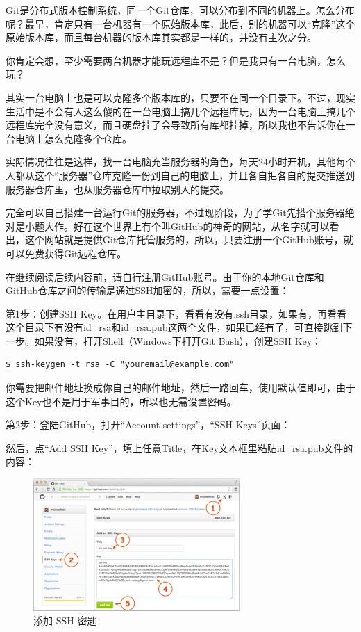 Git是分布式版本控制系统，同一个Git仓库，可以分布到不同的机器上。怎么分布呢？最早，肯定只有一台机器有一个原始版本库，此后，别的机器可以“克隆”这个原始版本库，而且每台机器的版本库其实都是一样的，并没有主次之分。

你肯定会想，至少需要两台机器才能玩远程库不是？但是我只有一台电脑，怎么玩？

其实一台电脑上也是可以克隆多个版本库的，只要不在同一个目录下。不过，现实生活中是不会有人这么傻的在一台电脑上搞几个远程库玩，因为一台电脑上搞几个远程库完全没有意义，而且硬盘挂了会导致所有库都挂掉，所以我也不告诉你在一台电脑上怎么克隆多个仓库。

实际情况往往是这样，找一台电脑充当服务器的角色，每天24小时开机，其他每个人都从这个“服务器”仓库克隆一份到自己的电脑上，并且各自把各自的提交推送到服务器仓库里，也从服务器仓库中拉取别人的提交。

完全可以自己搭建一台运行Git的服务器，不过现阶段，为了学Git先搭个服务器绝对是小题大作。好在这个世界上有个叫GitHub的神奇的网站，从名字就可以看出，这个网站就是提供Git仓库托管服务的，所以，只要注册一个GitHub账号，就可以免费获得Git远程仓库。

在继续阅读后续内容前，请自行注册GitHub账号。由于你的本地Git仓库和GitHub仓库之间的传输是通过SSH加密的，所以，需要一点设置：

第1步：创建SSH Key。在用户主目录下，看看有没有.ssh目录，如果有，再看看这个目录下有没有id\_rsa和id\_rsa.pub这两个文件，如果已经有了，可直接跳到下一步。如果没有，打开Shell（Windows下打开Git Bash），创建SSH Key：

\begin{verbatim}
$ ssh-keygen -t rsa -C "youremail@example.com"
\end{verbatim}

你需要把邮件地址换成你自己的邮件地址，然后一路回车，使用默认值即可，由于这个Key也不是用于军事目的，所以也无需设置密码。


第2步：登陆GitHub，打开“Account settings”，“SSH Keys”页面：

然后，点“Add SSH Key”，填上任意Title，在Key文本框里粘贴id\_rsa.pub文件的内容：


\begin{figure}[h]
  \centering
  \includegraphics[width=0.7\textwidth]{img/github-addkey-1.png}
  \caption{添加 SSH 密匙}
  \label{fig:mesh1}
\end{figure}

